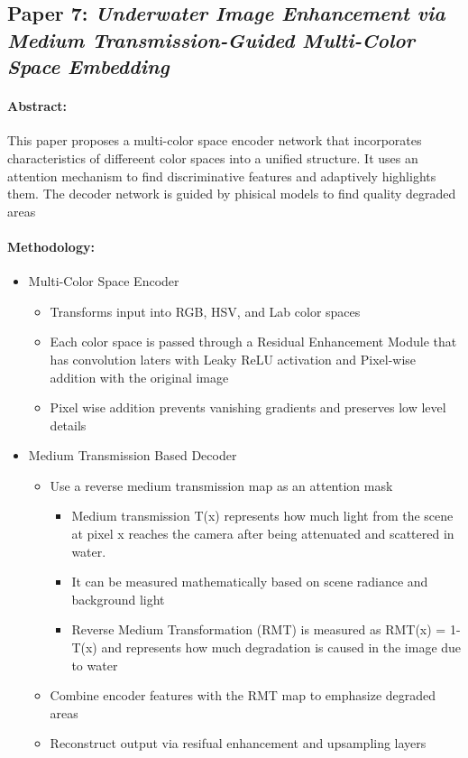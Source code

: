 \documentclass{article}
\begin{document}
\subsection{Paper 7: \textit{Underwater Image Enhancement via Medium
        Transmission-Guided Multi-Color Space Embedding\cite{Li_2021}}}

\paragraph{Abstract:}
This paper proposes a multi-color space encoder network that incorporates characteristics of differeent color spaces into a unified structure. It uses an attention mechanism to find discriminative features and adaptively highlights them. The decoder network is guided by phisical models to find quality degraded areas

\paragraph{Methodology:}
\begin{itemize}
    \item Multi-Color Space Encoder
          \begin{itemize}
              \item Transforms input into RGB, HSV, and Lab color spaces
              \item Each color space is passed through a Residual Enhancement Module that has convolution laters with Leaky ReLU activation and Pixel-wise addition with the original image
              \item Pixel wise addition prevents vanishing gradients and preserves low level details
          \end{itemize}

    \item Medium Transmission Based Decoder
          \begin{itemize}
              \item Use a reverse medium transmission map as an attention mask
                    \begin{itemize}
                        \item Medium transmission T(x) represents how much light from the scene at pixel x reaches the camera after being attenuated and scattered in water.
                        \item It can be measured mathematically based on scene radiance and background light
                        \item Reverse Medium Transformation (RMT) is measured as RMT(x) = 1-T(x) and represents how much degradation is caused in the image due to water
                    \end{itemize}
              \item Combine encoder features with the RMT map to emphasize degraded areas
              \item Reconstruct output via resifual enhancement and upsampling layers
          \end{itemize}
\end{itemize}
\end{document}
